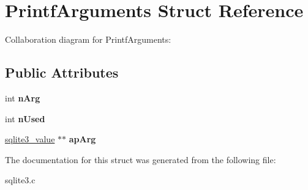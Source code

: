 \hypertarget{structPrintfArguments}{}\section{Printf\+Arguments Struct Reference}
\label{structPrintfArguments}


Collaboration diagram for Printf\+Arguments\+:
\subsection*{Public Attributes}
\begin{DoxyCompactItemize}
\item 
int {\bfseries n\+Arg}\hypertarget{structPrintfArguments_a8f4465ebae2de254882c3253f0f01993}{}\label{structPrintfArguments_a8f4465ebae2de254882c3253f0f01993}

\item 
int {\bfseries n\+Used}\hypertarget{structPrintfArguments_a686ce8f8451154f2ffd7b91cd0908327}{}\label{structPrintfArguments_a686ce8f8451154f2ffd7b91cd0908327}

\item 
\hyperlink{structMem}{sqlite3\+\_\+value} $\ast$$\ast$ {\bfseries ap\+Arg}\hypertarget{structPrintfArguments_a78d20f483184bdb3c0abdeca93f1dd2d}{}\label{structPrintfArguments_a78d20f483184bdb3c0abdeca93f1dd2d}

\end{DoxyCompactItemize}


The documentation for this struct was generated from the following file\+:\begin{DoxyCompactItemize}
\item 
sqlite3.\+c\end{DoxyCompactItemize}
